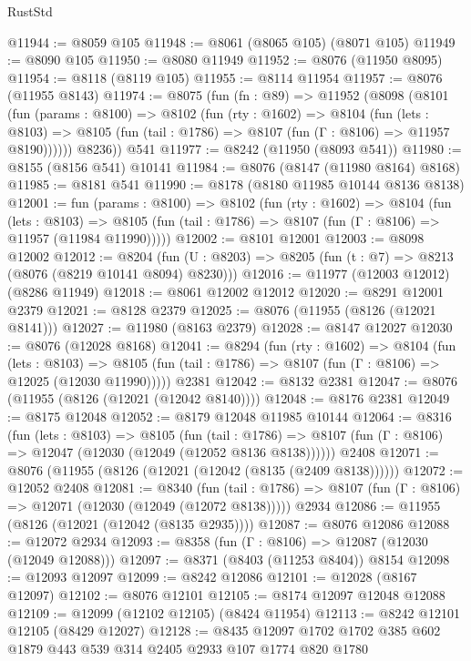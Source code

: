 \begin{lexlean}{RustStd}
\begin{coremodule}
@11944 := @8059 @105
@11948 := @8061 (@8065 @105) (@8071 @105)
@11949 := @8090 @105
@11950 := @8080 @11949
@11952 := @8076 (@11950 @8095)
@11954 := @8118 (@8119 @105)
@11955 := @8114 @11954
@11957 := @8076 (@11955 @8143)
@11974 := @8075
    (fun (fn : @89) =>
    @11952
      (@8098
        (@8101
          (fun (params : @8100) =>
          @8102
            (fun (rty : @1602) =>
            @8104
              (fun (lets : @8103) =>
              @8105 (fun (tail : @1786) => @8107 (fun (Γ : @8106) => @11957 @8190))))))
        @8236))
    @541
@11977 := @8242 (@11950 (@8093 @541))
@11980 := @8155 (@8156 @541) @10141
@11984 := @8076 (@8147 (@11980 @8164) @8168)
@11985 := @8181 @541
@11990 := @8178 (@8180 @11985 @10144 @8136 @8138)
@12001 := fun (params : @8100) =>
  @8102
    (fun (rty : @1602) =>
    @8104
      (fun (lets : @8103) =>
      @8105 (fun (tail : @1786) => @8107 (fun (Γ : @8106) => @11957 (@11984 @11990)))))
@12002 := @8101 @12001
@12003 := @8098 @12002
@12012 := @8204
    (fun (U : @8203) => @8205 (fun (t : @7) => @8213 (@8076 (@8219 @10141 @8094) @8230)))
@12016 := @11977 (@12003 @12012) (@8286 @11949)
@12018 := @8061 @12002 @12012
@12020 := @8291 @12001 @2379
@12021 := @8128 @2379
@12025 := @8076 (@11955 (@8126 (@12021 @8141)))
@12027 := @11980 (@8163 @2379)
@12028 := @8147 @12027
@12030 := @8076 (@12028 @8168)
@12041 := @8294
    (fun (rty : @1602) =>
    @8104
      (fun (lets : @8103) =>
      @8105 (fun (tail : @1786) => @8107 (fun (Γ : @8106) => @12025 (@12030 @11990)))))
    @2381
@12042 := @8132 @2381
@12047 := @8076 (@11955 (@8126 (@12021 (@12042 @8140))))
@12048 := @8176 @2381
@12049 := @8175 @12048
@12052 := @8179 @12048 @11985 @10144
@12064 := @8316
    (fun (lets : @8103) =>
    @8105
      (fun (tail : @1786) =>
      @8107 (fun (Γ : @8106) => @12047 (@12030 (@12049 (@12052 @8136 @8138))))))
    @2408
@12071 := @8076 (@11955 (@8126 (@12021 (@12042 (@8135 (@2409 @8138))))))
@12072 := @12052 @2408
@12081 := @8340
    (fun (tail : @1786) => @8107 (fun (Γ : @8106) => @12071 (@12030 (@12049 (@12072 @8138)))))
    @2934
@12086 := @11955 (@8126 (@12021 (@12042 (@8135 @2935))))
@12087 := @8076 @12086
@12088 := @12072 @2934
@12093 := @8358 (fun (Γ : @8106) => @12087 (@12030 (@12049 @12088)))
@12097 := @8371 (@8403 (@11253 @8404)) @8154
@12098 := @12093 @12097
@12099 := @8242 @12086
@12101 := @12028 (@8167 @12097)
@12102 := @8076 @12101
@12105 := @8174 @12097 @12048 @12088
@12109 := @12099 (@12102 @12105) (@8424 @11954)
@12113 := @8242 @12101 @12105 (@8429 @12027)
@12128 := @8435 @12097 @1702 @1702 @385 @602 @1879 @443 @539 @314 @2405 @2933 @107 @1774 @820 @1780

\end{coremodule}
\end{lexlean}
